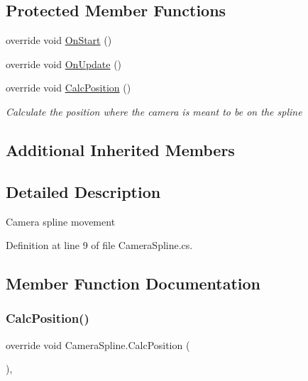 \subsection*{Protected Member Functions}
\begin{DoxyCompactItemize}
\item 
override void \mbox{\hyperlink{class_camera_spline_a8c3df3fb0d0ba26126d97432331a209b}{On\+Start}} ()
\item 
override void \mbox{\hyperlink{class_camera_spline_a52812811103b9fca941daf2edd3c763d}{On\+Update}} ()
\item 
override void \mbox{\hyperlink{class_camera_spline_a70ec10306e6894532589d3d1dffaa3ae}{Calc\+Position}} ()
\begin{DoxyCompactList}\small\item\em Calculate the position where the camera is meant to be on the spline \end{DoxyCompactList}\end{DoxyCompactItemize}
\subsection*{Additional Inherited Members}


\subsection{Detailed Description}
Camera spline movement 



Definition at line 9 of file Camera\+Spline.\+cs.



\subsection{Member Function Documentation}
\mbox{\label{class_camera_spline_a70ec10306e6894532589d3d1dffaa3ae}} 
\subsubsection{\texorpdfstring{Calc\+Position()}{CalcPosition()}}
{\footnotesize\ttfamily override void Camera\+Spline.\+Calc\+Position (\begin{DoxyParamCaption}{ }\end{DoxyParamCaption})\hspace{0.3cm}{\ttfamily [protected]}, {\ttfamily [virtual]}}




